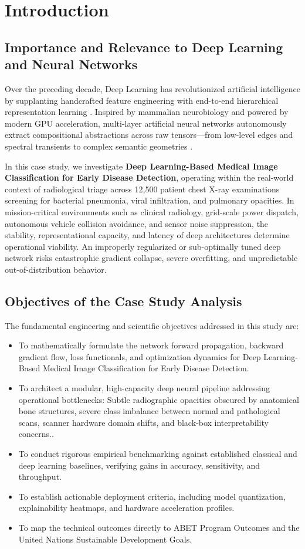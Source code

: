 \section{Introduction}

\subsection{Importance and Relevance to Deep Learning and Neural Networks}
Over the preceding decade, Deep Learning has revolutionized artificial intelligence by supplanting handcrafted feature engineering with end-to-end hierarchical representation learning \cite{lecun2015deep}. Inspired by mammalian neurobiology and powered by modern GPU acceleration, multi-layer artificial neural networks autonomously extract compositional abstractions across raw tensors---from low-level edges and spectral transients to complex semantic geometries \cite{goodfellow2016deep}.

In this case study, we investigate \textbf{Deep Learning-Based Medical Image Classification for Early Disease Detection}, operating within the real-world context of radiological triage across 12,500 patient chest X-ray examinations screening for bacterial pneumonia, viral infiltration, and pulmonary opacities. In mission-critical environments such as clinical radiology, grid-scale power dispatch, autonomous vehicle collision avoidance, and sensor noise suppression, the stability, representational capacity, and latency of deep architectures determine operational viability. An improperly regularized or sub-optimally tuned deep network risks catastrophic gradient collapse, severe overfitting, and unpredictable out-of-distribution behavior.

\subsection{Objectives of the Case Study Analysis}
The fundamental engineering and scientific objectives addressed in this study are:
\begin{itemize}
  \item To mathematically formulate the network forward propagation, backward gradient flow, loss functionals, and optimization dynamics for Deep Learning-Based Medical Image Classification for Early Disease Detection.
  \item To architect a modular, high-capacity deep neural pipeline addressing operational bottlenecks: Subtle radiographic opacities obscured by anatomical bone structures, severe class imbalance between normal and pathological scans, scanner hardware domain shifts, and black-box interpretability concerns..
  \item To conduct rigorous empirical benchmarking against established classical and deep learning baselines, verifying gains in accuracy, sensitivity, and throughput.
  \item To establish actionable deployment criteria, including model quantization, explainability heatmaps, and hardware acceleration profiles.
  \item To map the technical outcomes directly to ABET Program Outcomes and the United Nations Sustainable Development Goals.
\end{itemize}
